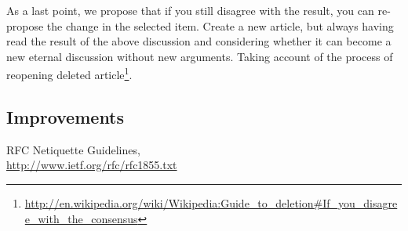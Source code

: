 \documentclass[11pt]{scrartcl}
\begin{document}
\par As a last point, we propose that if you still disagree with the result, you can re-propose the change in the selected item. Create a new article, but always having read the result of the above discussion and considering whether it can become a new eternal discussion without new arguments. Taking account of the process of reopening deleted article\footnote{\url{http://en.wikipedia.org/wiki/Wikipedia:Guide_to_deletion\#If_you_disagree_with_the_consensus}}.


\subsection{Improvements}
\label{sub:}


\begin{thebibliography}{9}

    RFC Netiquette Guidelines,\\
    \url{http://www.ietf.org/rfc/rfc1855.txt}

\end{thebibliography}
\end{document}
